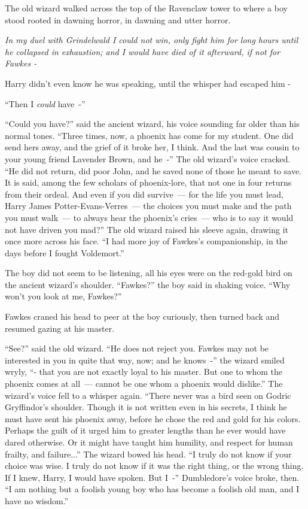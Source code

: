 The old wizard walked across the top of the Ravenclaw tower to where a boy stood rooted in dawning horror, in dawning and utter horror.

\emph{In my duel with Grindelwald I could not win, only fight him for long hours until he collapsed in exhaustion; and I would have died of it afterward, if not for Fawkes -}

Harry didn't even know he was speaking, until the whisper had escaped him -

``Then I \emph{could} have~-''

``Could you have?'' said the ancient wizard, his voice sounding far older than his normal tones. ``Three times, now, a phoenix has come for my student. One did send hers away, and the grief of it broke her, I think. And the last was cousin to your young friend Lavender Brown, and he~-'' The old wizard's voice cracked. ``He did not return, did poor John, and he saved none of those he meant to save. It is said, among the few scholars of phoenix-lore, that not one in four returns from their ordeal. And even if you did survive~--- for the life you must lead, Harry James Potter-Evans-Verres~--- the choices you must make and the path you must walk~--- to always hear the phoenix's cries~--- who is to say it would not have driven you mad?'' The old wizard raised his sleeve again, drawing it once more across his face. ``I had more joy of Fawkes's companionship, in the days before I fought Voldemort.''

The boy did not seem to be listening, all his eyes were on the red-gold bird on the ancient wizard's shoulder. ``Fawkes?'' the boy said in shaking voice. ``Why won't you look at me, Fawkes?''

Fawkes craned his head to peer at the boy curiously, then turned back and resumed gazing at his master.

``See?'' said the old wizard. ``He does not reject you. Fawkes may not be interested in you in quite that way, now; and he knows~-'' the wizard smiled wryly, ``- that you are not exactly loyal to his master. But one to whom the phoenix comes at all~--- cannot be one whom a phoenix would dislike.'' The wizard's voice fell to a whisper again. ``There never was a bird seen on Godric Gryffindor's shoulder. Though it is not written even in his secrets, I think he must have sent his phoenix away, before he chose the red and gold for his colors. Perhaps the guilt of it urged him to greater lengths than he ever would have dared otherwise. Or it might have taught him humility, and respect for human frailty, and failure...'' The wizard bowed his head. ``I truly do not know if your choice was wise. I truly do not know if it was the right thing, or the wrong thing. If I knew, Harry, I would have spoken. But I~-'' Dumbledore's voice broke, then. ``I am nothing but a foolish young boy who has become a foolish old man, and I have no wisdom.''

